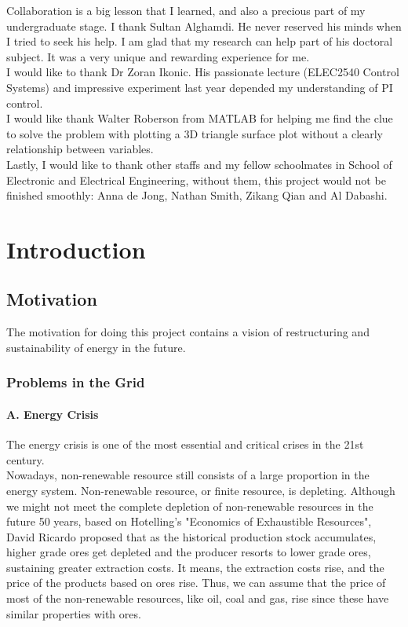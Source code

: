 \documentclass{report}
\begin{document}
Collaboration is a big lesson that I learned, and also a precious part of my undergraduate stage. I thank Sultan Alghamdi. He never reserved his minds when I tried to seek his help. I am glad that my research can help part of his doctoral subject. It was a very unique and rewarding experience for me.\\

I would like to thank Dr Zoran Ikonic. His passionate lecture (ELEC2540 Control Systems) and impressive experiment last year depended my understanding of PI control.\\

I would like thank Walter Roberson from MATLAB for helping me find the clue to solve the problem with plotting a 3D triangle surface plot without a clearly relationship between variables.\\

Lastly, I would like to thank other staffs and my fellow schoolmates in School of Electronic and Electrical Engineering, without them, this project would not be finished smoothly: Anna de Jong, Nathan Smith, Zikang Qian and Al Dabashi.\\



\afterpreface
\chapter{Introduction}
\section{Motivation} %
The motivation for doing this project contains a vision of restructuring and sustainability of energy in the future.
\subsection{Problems in the Grid}
\subsubsection{A. Energy Crisis}
The energy crisis is one of the most essential and critical crises in the 21st century.\\

Nowadays, non-renewable resource still consists of a large proportion in the energy system. Non-renewable resource, or finite resource, is depleting. Although we might not meet the complete depletion of non-renewable resources in the future 50 years, based on Hotelling’s "Economics of Exhaustible Resources", David Ricardo proposed that as the historical production stock accumulates, higher grade ores get depleted and the producer resorts to lower grade ores, sustaining greater extraction costs. It means, the extraction costs rise, and the price of the products based on ores rise. Thus, we can assume that the price of most of the non-renewable resources, like oil, coal and gas, rise since these have similar properties with ores.\\
\end{document}
